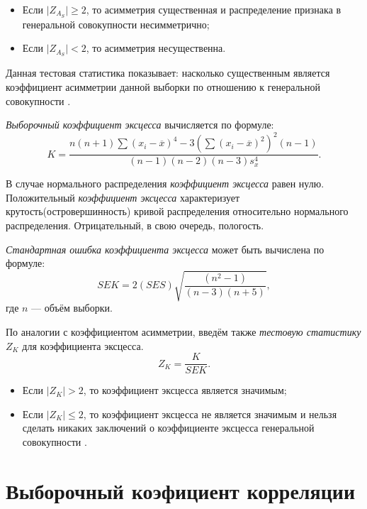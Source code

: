\begin{itemize}
	\item Если $\vert Z_{A_S} \vert \ge 2$, то асимметрия существенная и распределение признака в генеральной совокупности несимметрично;
	\item Если $\vert Z_{A_S} \vert < 2$, то асимметрия несущественна.
\end{itemize}
Данная тестовая статистика показывает: насколько существенным является коэффициент асимметрии данной выборки по отношению к генеральной совокупности \cite[с.85]{Cramer1997}. 

\textit{Выборочный коэффициент эксцесса} вычисляется по формуле:
\begin{equation*}
	K = \frac{n(n + 1) \sum{(x_i - \overline{x})^4} - 3(\sum{(x_i - \overline{x})^2})^2 (n - 1)}{(n - 1)(n - 2)(n - 3)s_x^4}.
\end{equation*}

В случае нормального распределения \textit{коэффициент эксцесса} равен нулю. Положительный \textit{коэффициент эксцесса} характеризует крутость(островершинность) кривой распределения относительно нормального распределения. Отрицательный, в свою очередь, пологость.

\textit{Стандартная ошибка коэффициента эксцесса} может быть вычислена по формуле:
\begin{equation*}
	SEK = 2(SES) \sqrt{\frac{(n^2 - 1)}{(n - 3)(n + 5)}},
\end{equation*}
где $n$ --- объём выборки.

По аналогии с коэффициентом асимметрии, введём также \textit{тестовую статистику} $Z_K$ для коэффициента эксцесса.
\begin{equation*}
	Z_K = \frac{K}{SEK}.
\end{equation*}

\begin{itemize}
	\item Если $\vert Z_K \vert > 2$, то коэффициент эксцесса является значимым;
	\item Если $\vert Z_K \vert \le 2$, то коэффициент эксцесса не является значимым и нельзя сделать никаких заключений о коэффициенте эксцесса генеральной совокупности \cite[с.89]{Cramer1997}.
\end{itemize}


\section*{Выборочный коэфициент корреляции} %
\label{sec:correlation}

